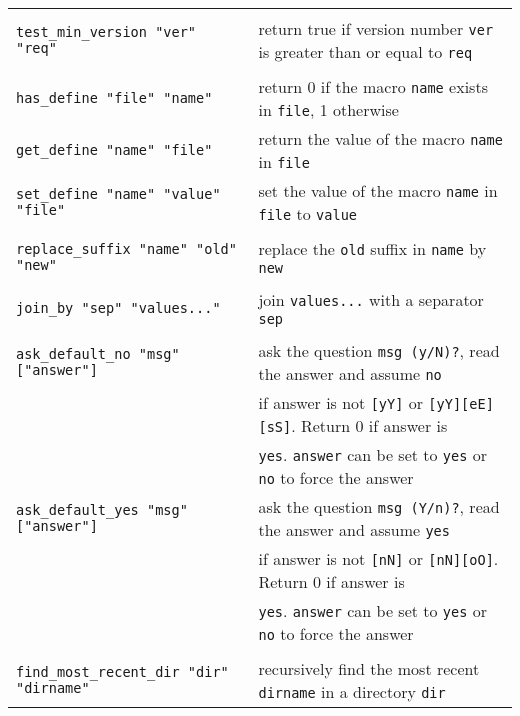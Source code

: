 \documentclass[documentation]{subfiles}
\begin{document}
\begin{longtable}{>{\tt}ll}
                                                & \\
    test\_min\_version "ver" "req"              & return true if version number {\tt ver} is greater than or equal to {\tt req}\\
                                                & \\
    has\_define "file" "name"                   & return 0 if the macro {\tt name} exists in {\tt file}, 1 otherwise\\
    get\_define "name" "file"                   & return the value of the macro {\tt name} in {\tt file}\\
    set\_define "name" "value" "file"           & set the value of the macro {\tt name} in {\tt file} to {\tt value}\\
                                                & \\
    replace\_suffix "name" "old" "new"          & replace the {\tt old} suffix in {\tt name} by {\tt new}\\
                                                & \\
    join\_by "sep" "values..."                  & join {\tt values...} with a separator {\tt sep}\\
                                                & \\
    ask\_default\_no  "msg" ["answer"]          & ask the question {\tt msg (y/N)?}, read the answer and assume {\tt no}\\
                                                & if answer is not {\tt [yY]} or {\tt [yY][eE][sS]}. Return 0 if answer is\\
                                                & {\tt yes}. {\tt answer} can be set to {\tt yes} or {\tt no} to force the answer\\
    ask\_default\_yes "msg" ["answer"]          & ask the question {\tt msg (Y/n)?}, read the answer and assume {\tt yes}\\
                                                & if answer is not {\tt [nN]} or {\tt [nN][oO]}. Return 0 if answer is\\
                                                & {\tt yes}. {\tt answer} can be set to {\tt yes} or {\tt no} to force the answer\\
                                                & \\
    find\_most\_recent\_dir "dir" "dirname"     & recursively find the most recent {\tt dirname} in a directory {\tt dir}\\

\end{longtable}
\end{document}
